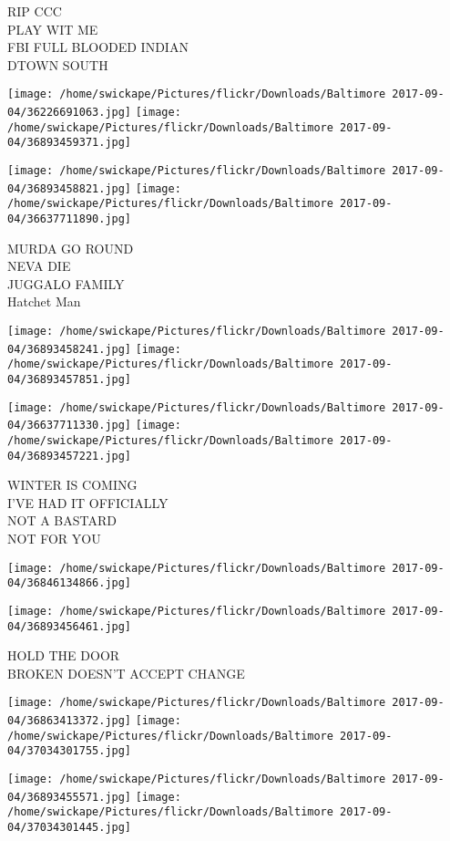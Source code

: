 \documentclass[10pt,letterpaper]{article}
\begin{document}
RIP CCC\\
PLAY WIT ME\\
FBI FULL BLOODED INDIAN\\
DTOWN SOUTH
\pagebreak

\texttt{[image: /home/swickape/Pictures/flickr/Downloads/Baltimore 2017-09-04/36226691063.jpg]}
\texttt{[image: /home/swickape/Pictures/flickr/Downloads/Baltimore 2017-09-04/36893459371.jpg]}

\texttt{[image: /home/swickape/Pictures/flickr/Downloads/Baltimore 2017-09-04/36893458821.jpg]}
\texttt{[image: /home/swickape/Pictures/flickr/Downloads/Baltimore 2017-09-04/36637711890.jpg]}

MURDA GO ROUND\\
NEVA DIE\\
JUGGALO FAMILY\\
Hatchet Man
\pagebreak

\texttt{[image: /home/swickape/Pictures/flickr/Downloads/Baltimore 2017-09-04/36893458241.jpg]}
\texttt{[image: /home/swickape/Pictures/flickr/Downloads/Baltimore 2017-09-04/36893457851.jpg]}

\texttt{[image: /home/swickape/Pictures/flickr/Downloads/Baltimore 2017-09-04/36637711330.jpg]}
\texttt{[image: /home/swickape/Pictures/flickr/Downloads/Baltimore 2017-09-04/36893457221.jpg]}

WINTER IS COMING\\
I'VE HAD IT OFFICIALLY\\
NOT A BASTARD\\
NOT FOR YOU
\pagebreak

\texttt{[image: /home/swickape/Pictures/flickr/Downloads/Baltimore 2017-09-04/36846134866.jpg]}

\vspace{0.25in}
\texttt{[image: /home/swickape/Pictures/flickr/Downloads/Baltimore 2017-09-04/36893456461.jpg]}

HOLD THE DOOR\\
BROKEN DOESN'T ACCEPT CHANGE
\pagebreak

\texttt{[image: /home/swickape/Pictures/flickr/Downloads/Baltimore 2017-09-04/36863413372.jpg]}
\texttt{[image: /home/swickape/Pictures/flickr/Downloads/Baltimore 2017-09-04/37034301755.jpg]}

\texttt{[image: /home/swickape/Pictures/flickr/Downloads/Baltimore 2017-09-04/36893455571.jpg]}
\texttt{[image: /home/swickape/Pictures/flickr/Downloads/Baltimore 2017-09-04/37034301445.jpg]}
\end{document}
